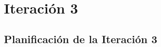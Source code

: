 \section{Iteración 3}
\label{sec:iteracion_3}




%

%

%


\subsection{Planificación de la Iteración 3}

